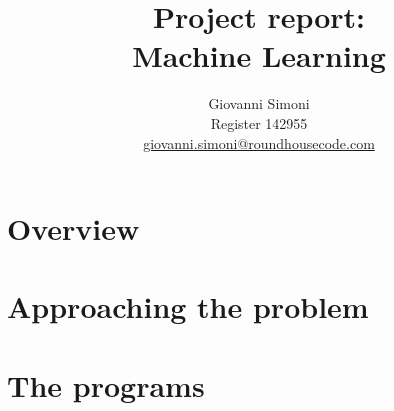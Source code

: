 \documentclass[10pt,a4paper]{article}
\title {
    Project report:\\
    Machine Learning
}
\author{
    Giovanni Simoni\\
    Register 142955\\
    \href{mailto:giovanni.simoni@roundhousecode.com}
         {giovanni.simoni@roundhousecode.com}
}
\begin{document}
    \maketitle

    \tableofcontents

    \newpage
    \section{ Overview } \label{sec:Overview}
    

    \section{ Approaching the problem } \label{sec:ApproachingProblem}
    

    \section{ The programs } \label{sec:Programs}
    
\end{document}
